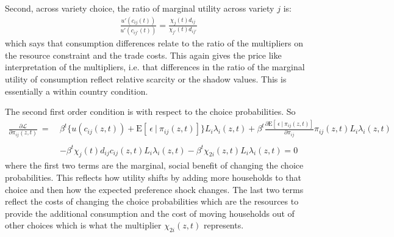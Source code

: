 \documentclass[12pt,pdftex]{article}
\begin{document}
\begin{onehalfspacing}
Second, across variety choice, the ratio of marginal utility across variety $j$ is:
\begin{align}
\frac{u'(c_{ij}(t))}{u'(c_{ij'}(t))} = \frac{\chi_{j}(t) d_{ij}}{\chi_{j'}(t) d_{ij'}}
\end{align}
which says that consumption differences relate to the ratio of the multipliers on the resource constraint and the trade costs. This again gives the price like interpretation of the multipliers, i.e. that differences in the ratio of the marginal utility of consumption reflect relative scarcity or the shadow values. This is essentially a within country \citet{backus1993} condition.

The second first order condition is with respect to the choice probabilities. So
\begin{align}
\frac{\partial \mathcal{L} }{\partial \pi_{ij}(z, t)} \ = \ & \beta^{t}\bigg \{  u(c_{ij}(z, t) ) + \mathrm{E}[ \ \epsilon \ | \ \pi_{ij}(z,t) ] \bigg \} L_{i} \lambda_{i}(z, t) + \beta^{t}\frac{\partial \mathrm{E}[ \ \epsilon \ | \ \pi_{ij}(z,t) ]}{\partial \pi_{ij}}\pi_{ij}(z,t) L_{i} \lambda_{i}(z, t) \nonumber \\
\nonumber \\
& - \beta^{t} \chi_{j}(t) d_{ij} c_{ij}(z, t) L_{i}\lambda_{i}(z, t) - \beta^{t} \chi_{2i}(z,t) L_{i} \lambda_{i}(z, t)  = 0
\end{align}
where the first two terms are the marginal, social benefit of changing the choice probabilities. This reflects how utility shifts by adding more households to that choice and then how the expected preference shock changes. The last two terms reflect the costs of changing the choice probabilities which are the resources to provide the additional consumption and the cost of moving households out of other choices which is what the multiplier $\chi_{2i}(z,t)$ represents.


\end{onehalfspacing}
\end{document}
